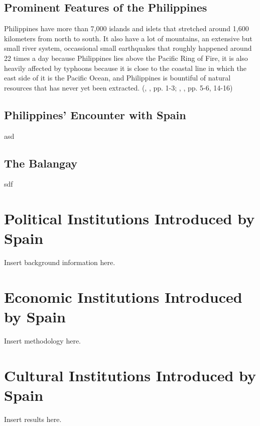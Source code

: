 \documentclass[12pt]{article}
\begin{document}
  \subsection{Prominent Features of the Philippines}
  Philippines have more than 7,000 islands and islets that stretched around 1,600 kilometers from north to south. It also have a lot of mountains, an extensive but small
  river system, occassional small earthquakes that roughly happened around 22 times a day because Philippines lies above the Pacific Ring of Fire, it is also heavily affected
  by typhoons because it is close to the coastal line in which the east side of it is the Pacific Ocean, and Philippines is bountiful of natural resources that
  has never yet been extracted. (\citeauthor{agoncillo1990filipino}, \citeyear{agoncillo1990filipino}, pp. 1-3; \citeauthor{foreman1899islands}, \citeyear{foreman1899islands}, pp. 5-6, 14-16)
   


  \subsection{Philippines' Encounter with Spain}
  asd
  \subsection{The Balangay}
  sdf






\section{Political Institutions Introduced by Spain}
Insert background information here.






\section{Economic Institutions Introduced by Spain}
Insert methodology here.





\section{Cultural Institutions Introduced by Spain}
Insert results here.








\end{document}
